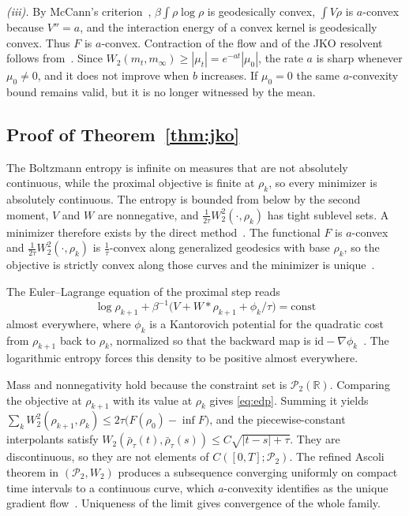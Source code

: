 \documentclass[anon,11pt]{alt2027}
\providecommand{\qed}{\hfill\BlackBox}
\newcommand{\R}{\mathbb{R}}
\newcommand{\Ptwo}{\mathcal{P}_2}
\newcommand{\Wtwo}{W_2}
\begin{document}
\emph{(iii).}
By McCann's criterion~\cite{McCann97}, $\beta\int\rho\log\rho$ is geodesically
convex, $\int V\rho$ is $a$-convex because $V''=a$, and the interaction energy
of a convex kernel is geodesically convex. Thus $F$ is $a$-convex. Contraction
of the flow and of the JKO resolvent follows from~\cite[Thm.~11.2.1 and
Thm.~4.0.4]{AGS08}. Since $\Wtwo(m_t,m_\infty)\ge|\mu_t|=e^{-at}|\mu_0|$, the
rate $a$ is sharp whenever $\mu_0\neq 0$, and it does not improve when $b$
increases. If $\mu_0=0$ the same $a$-convexity bound remains valid, but it is
no longer witnessed by the mean.\qed

\subsection{Proof of Theorem~\ref{thm:jko}}

The Boltzmann entropy is infinite on measures that are not absolutely
continuous, while the proximal objective is finite at $\rho_k$, so every
minimizer is absolutely continuous. The entropy is bounded from below by the
second moment, $V$ and $W$ are nonnegative, and
$\frac1{2\tau}\Wtwo^2(\cdot,\rho_k)$ has tight sublevel sets. A minimizer
therefore exists by the direct method~\cite{AGS08}. The functional $F$ is
$a$-convex and $\frac1{2\tau}\Wtwo^2(\cdot,\rho_k)$ is $\frac1\tau$-convex along
generalized geodesics with base $\rho_k$, so the objective is strictly convex
along those curves and the minimizer is unique~\cite[Ch.~4]{AGS08}.

The Euler--Lagrange equation of the proximal step reads
\begin{equation}
\label{eq:el}
\log\rho_{k+1}
+
\beta^{-1}\bigl(V+W\ast\rho_{k+1}+\phi_k/\tau\bigr)
=
\mathrm{const}
\end{equation}
almost everywhere, where $\phi_k$ is a Kantorovich potential for the quadratic
cost from $\rho_{k+1}$ back to $\rho_k$, normalized so that the backward map is
$\mathrm{id}-\nabla\phi_k$~\cite{JKO98,Santambrogio15}. The logarithmic entropy
forces this density to be positive almost everywhere.

Mass and nonnegativity hold because the constraint set is $\Ptwo(\R)$.
Comparing the objective at $\rho_{k+1}$ with its value at $\rho_k$ gives
\eqref{eq:edp}. Summing it yields
$\sum_k\Wtwo^2(\rho_{k+1},\rho_k)\le 2\tau\bigl(F(\rho_0)-\inf F\bigr)$, and the
piecewise-constant interpolants satisfy
$\Wtwo(\bar\rho_\tau(t),\bar\rho_\tau(s))\le C\sqrt{|t-s|+\tau}$.
They are discontinuous, so they are not elements of $C([0,T];\Ptwo)$. The
refined Ascoli theorem in $(\Ptwo,\Wtwo)$ produces a subsequence converging
uniformly on compact time intervals to a continuous curve, which $a$-convexity
identifies as the unique gradient flow~\cite[Thm.~11.1.6 and
Thm.~4.0.4]{AGS08}. Uniqueness of the limit gives convergence of the whole
family.\qed
\end{document}
